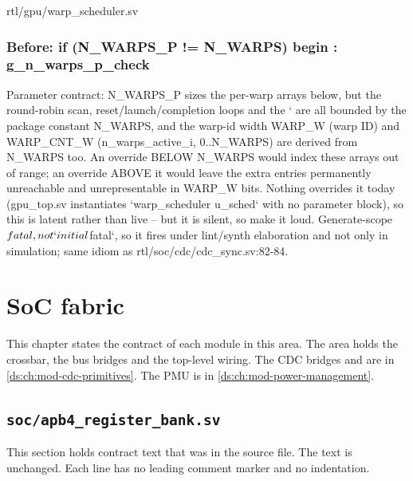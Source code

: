 \begin{relocated}{rtl/gpu/warp_scheduler.sv}

\subsection*{Before: if (N\_WARPS\_P != N\_WARPS) begin : g\_n\_warps\_p\_check}

\begin{textblock}
Parameter contract: N_WARPS_P sizes the per-warp arrays below, but the
round-robin scan, reset/launch/completion loops and the `%
are all bounded by the package constant N_WARPS, and the warp-id width
WARP_W (warp ID) and WARP_CNT_W (n_warps_active_i, 0..N_WARPS) are derived from N_WARPS too.
An override BELOW N_WARPS would index these arrays out of range; an
override ABOVE it would leave the extra entries permanently unreachable
and unrepresentable in WARP_W bits.  Nothing overrides it today
(gpu_top.sv instantiates `warp_scheduler u_sched` with no parameter
block), so this is latent rather than live -- but it is silent, so make
it loud.  Generate-scope $fatal, not `initial $fatal`, so it fires under
lint/synth elaboration and not only in simulation; same idiom as
rtl/soc/cdc/cdc_sync.sv:82-84.
\end{textblock}

\end{relocated}








\chapter{SoC fabric}\label{ds:ch:mod-soc-fabric}

This chapter states the contract of each module in this area. The area holds the crossbar, the bus bridges and the top-level wiring. The CDC bridges  and  are in \cref{ds:ch:mod-cdc-primitives}. The PMU is in \cref{ds:ch:mod-power-management}.

\section{\texttt{soc/apb4\_register\_bank.sv}}\label{ds:mod:apb4-register-bank}

This section holds contract text that was in the source file. The text is unchanged. Each line has no leading comment marker and no indentation.

